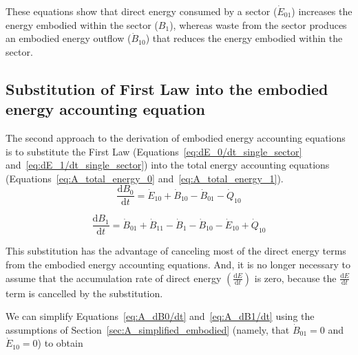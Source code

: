 These equations show that direct energy consumed by a 
sector ($\dot{E}_{01}$) increases the energy embodied within the sector ($B_1$), 
whereas waste from the sector produces an embodied
energy outflow ($\dot{B}_{10}$) that reduces 
the energy embodied within the sector. 


\subsection{Substitution of First Law
into the embodied energy accounting equation} %
\label{subsec:A_first_law_embodied}

The second approach to the derivation of embodied energy
accounting equations is to substitute the First Law
(Equations~\ref{eq:dE_0/dt_single_sector} and~\ref{eq:dE_1/dt_single_sector}) 
into the total energy accounting equations 
(Equations~\ref{eq:A_total_energy_0} and~\ref{eq:A_total_energy_1}). 
\begin{equation} \label{eq:A_dB0/dt}
	\frac{\mathrm{d}B_{0}}{\mathrm{d}t} 
	= \dot{E}_{10}
	+ \dot{B}_{10} 
	- \dot{B}_{01}
	- \dot{Q}_{10}
\end{equation}

\begin{equation} \label{eq:A_dB1/dt}
	\frac{\mathrm{d}B_{1}}{\mathrm{d}t} 
	= \dot{B}_{01} 
	+ \dot{B}_{11}
	- \dot{B}_{1}
	- \dot{B}_{10}
	- \dot{E}_{10}
	+ \dot{Q}_{10}
\end{equation}

This substitution has the advantage of canceling most 
of the direct energy terms from the embodied energy accounting equations.
And, it is no longer necessary to assume that the 
accumulation rate of direct energy
$\left( \frac{\mathrm{d}E}{\mathrm{d}t} \right)$
is zero, because the 
$\frac{\mathrm{d}E}{\mathrm{d}t}$
term is cancelled by the substitution.

% 
% 
%
We can simplify 
Equations~\ref{eq:A_dB0/dt} and~\ref{eq:A_dB1/dt} 
using the assumptions of Section~\ref{sec:A_simplified_embodied} 
(namely, that $\dot{B}_{01} = 0$ and $\dot{E}_{10} = 0$)
to obtain

